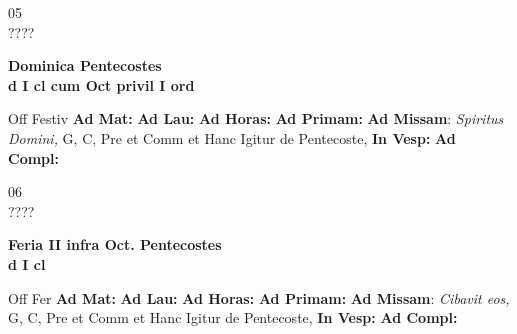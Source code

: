 \documentclass[10pt, openany]{book}
\begin{document}
    \begin{center}
        \begin{minipage}{3.5in}
            \vspace{2em}
            \begin{minipage}{0.5in}
                {\Huge 05} \\
                {\normalsize ????}
            \end{minipage}
            \begin{minipage}{3.0in}
                \textbf{ \large Dominica Pentecostes \\
                \textnormal{\normalsize d I cl cum Oct privil I ord}}

            \end{minipage}
            \begin{justify}Off Festiv
                \textbf{Ad Mat: }
                \textbf{Ad Lau: }
                \textbf{Ad Horas: }
                \textbf{Ad Primam: }\textbf{Ad Missam}: \textit{Spiritus Domini,} G, C, Pre et Comm et Hanc Igitur de Pentecoste, 
                \textbf{In Vesp: }
                \textbf{Ad Compl: }
            \end{justify}
        \end{minipage}
    \end{center}

    \begin{center}
        \begin{minipage}{3.5in}
            \vspace{2em}
            \begin{minipage}{0.5in}
                {\Huge 06} \\
                {\normalsize ????}
            \end{minipage}
            \begin{minipage}{3.0in}
                \textbf{ \large Feria II infra Oct. Pentecostes \\
                \textnormal{\normalsize d I cl}}

            \end{minipage}
            \begin{justify}Off Fer
                \textbf{Ad Mat: }
                \textbf{Ad Lau: }
                \textbf{Ad Horas: }
                \textbf{Ad Primam: }\textbf{Ad Missam}: \textit{Cibavit eos,} G, C, Pre et Comm et Hanc Igitur de Pentecoste, 
                \textbf{In Vesp: }
                \textbf{Ad Compl: }
            \end{justify}
        \end{minipage}
    \end{center}
\end{document}

